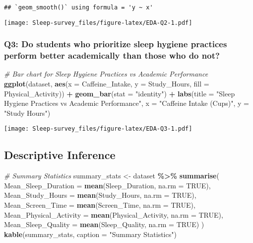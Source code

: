 \documentclass[
]{article}
\newenvironment{Shaded}{\begin{snugshade}}{\end{snugshade}}
\newcommand{\AttributeTok}[1]{\textcolor[rgb]{0.13,0.29,0.53}{#1}}
\newcommand{\CommentTok}[1]{\textcolor[rgb]{0.56,0.35,0.01}{\textit{#1}}}
\newcommand{\ConstantTok}[1]{\textcolor[rgb]{0.56,0.35,0.01}{#1}}
\newcommand{\FunctionTok}[1]{\textcolor[rgb]{0.13,0.29,0.53}{\textbf{#1}}}
\newcommand{\NormalTok}[1]{#1}
\newcommand{\OtherTok}[1]{\textcolor[rgb]{0.56,0.35,0.01}{#1}}
\newcommand{\SpecialCharTok}[1]{\textcolor[rgb]{0.81,0.36,0.00}{\textbf{#1}}}
\newcommand{\StringTok}[1]{\textcolor[rgb]{0.31,0.60,0.02}{#1}}
\begin{document}
\begin{verbatim}
## `geom_smooth()` using formula = 'y ~ x'
\end{verbatim}

\texttt{[image: Sleep-survey\_files/figure-latex/EDA-Q2-1.pdf]}

\subsubsection{Q3: Do students who prioritize sleep hygiene practices
perform better academically than those who do
not?}\label{q3-do-students-who-prioritize-sleep-hygiene-practices-perform-better-academically-than-those-who-do-not}

\begin{Shaded}
\begin{Highlighting}[]
\CommentTok{\# Bar chart for Sleep Hygiene Practices vs Academic Performance}
\FunctionTok{ggplot}\NormalTok{(dataset, }\FunctionTok{aes}\NormalTok{(}\AttributeTok{x =}\NormalTok{ Caffeine\_Intake, }\AttributeTok{y =}\NormalTok{ Study\_Hours, }\AttributeTok{fill =}\NormalTok{ Physical\_Activity)) }\SpecialCharTok{+}
  \FunctionTok{geom\_bar}\NormalTok{(}\AttributeTok{stat =} \StringTok{"identity"}\NormalTok{) }\SpecialCharTok{+}
  \FunctionTok{labs}\NormalTok{(}\AttributeTok{title =} \StringTok{"Sleep Hygiene Practices vs Academic Performance"}\NormalTok{,}
       \AttributeTok{x =} \StringTok{"Caffeine Intake (Cups)"}\NormalTok{,}
       \AttributeTok{y =} \StringTok{"Study Hours"}\NormalTok{)}
\end{Highlighting}
\end{Shaded}

\texttt{[image: Sleep-survey\_files/figure-latex/EDA-Q3-1.pdf]}

\subsection{Descriptive Inference}\label{descriptive-inference}

\begin{Shaded}
\begin{Highlighting}[]
\CommentTok{\# Summary Statistics}
\NormalTok{summary\_stats }\OtherTok{\textless{}{-}}\NormalTok{ dataset }\SpecialCharTok{\%\textgreater{}\%}
  \FunctionTok{summarise}\NormalTok{(}
    \AttributeTok{Mean\_Sleep\_Duration =} \FunctionTok{mean}\NormalTok{(Sleep\_Duration, }\AttributeTok{na.rm =} \ConstantTok{TRUE}\NormalTok{),}
    \AttributeTok{Mean\_Study\_Hours =} \FunctionTok{mean}\NormalTok{(Study\_Hours, }\AttributeTok{na.rm =} \ConstantTok{TRUE}\NormalTok{),}
    \AttributeTok{Mean\_Screen\_Time =} \FunctionTok{mean}\NormalTok{(Screen\_Time, }\AttributeTok{na.rm =} \ConstantTok{TRUE}\NormalTok{),}
    \AttributeTok{Mean\_Physical\_Activity =} \FunctionTok{mean}\NormalTok{(Physical\_Activity, }\AttributeTok{na.rm =} \ConstantTok{TRUE}\NormalTok{),}
    \AttributeTok{Mean\_Sleep\_Quality =} \FunctionTok{mean}\NormalTok{(Sleep\_Quality, }\AttributeTok{na.rm =} \ConstantTok{TRUE}\NormalTok{)}
\NormalTok{  )}
\FunctionTok{kable}\NormalTok{(summary\_stats, }\AttributeTok{caption =} \StringTok{"Summary Statistics"}\NormalTok{)}
\end{Highlighting}
\end{Shaded}
\end{document}
